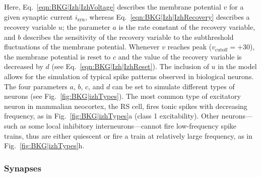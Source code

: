 Here, Eq.~\ref{eqn:BKG|Izh|IzhVoltage}
describes the membrane potential $v$ for a given
synaptic current $i_{\textrm{syn}}$, 
whereas Eq.~\ref{eqn:BKG|Izh|IzhRecovery}
describes a recovery variable $u$;
the parameter $a$ is the rate constant of the recovery variable,
and $b$ describes the sensitivity of the recovery variable to the
subthreshold fluctuations of the membrane potential. Whenever
$v$ reaches peak ($v_{\textrm{cutoff}} = +30$), 
the membrane potential is reset to $c$ and the 
value of the recovery variable is decreased by $d$
(see Eq.~\ref{eqn:BKG|Izh|IzhReset}).
The inclusion of $u$ in the model allows for the simulation
of typical spike patterns observed in biological neurons. The four
parameters $a$, $b$, $c$, and $d$ can be set to simulate 
different types of neurons (see Fig.~\ref{fig:BKG|izhTypes}).
The most common type of excitatory neuron in mammalian neocortex,
the \acf{RS} cell, fires tonic spikes with decreasing frequency, as in
Fig.~\ref{fig:BKG|izhTypes}a (class 1 excitability).
Other neurons---such as some local inhibitory interneurons---cannot fire 
low-frequency spike trains, thus are either quiescent or fire a train at
relatively large frequency, as in Fig.~\ref{fig:BKG|izhTypes}h.



\subsubsection{Synapses}

